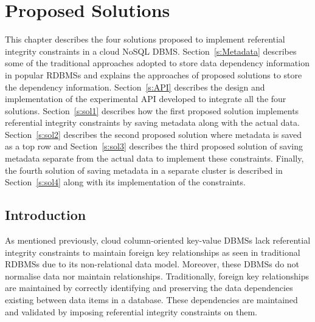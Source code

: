 \chapter{Proposed Solutions} \label{c:solutions}

This chapter describes the four  solutions proposed to implement referential
integrity constraints in a cloud \ac{NoSQL} \ac{DBMS}. 
Section~\ref{s:Metadata} describes some of the 
traditional approaches adopted to store  data dependency information in
popular \acp{RDBMS} and explains  the approaches of proposed solutions to store
the dependency information.  Section~\ref{s:API} describes the design and
implementation of the experimental API developed to integrate all the four
solutions. 
Section~\ref{s:sol1} describes how the first proposed solution implements
referential integrity constraints by saving metadata along with the actual data. 
Section~\ref{s:sol2} describes the second proposed solution where metadata
is saved as a top row and 
Section~\ref{s:sol3} describes the third  proposed solution of saving metadata
separate from the actual data to implement these constraints.  Finally, the
fourth solution of saving metadata in a separate cluster is described in Section~\ref{s:sol4} along with its implementation of the constraints. 

\section{Introduction}\label{Introduction-Solutions}
As mentioned previously, cloud column-oriented key-value \acp{DBMS} lack
referential integrity constraints to
maintain foreign key relationships as seen in traditional
\acp{RDBMS} due to its non-relational data model.  Moreover, these \acp{DBMS} do
not normalise data nor maintain relationships.  Traditionally, foreign key
relationships are maintained by correctly identifying and preserving the data
dependencies existing between data items in a database.  These dependencies
are maintained and  validated by imposing referential integrity constraints on
them. 

